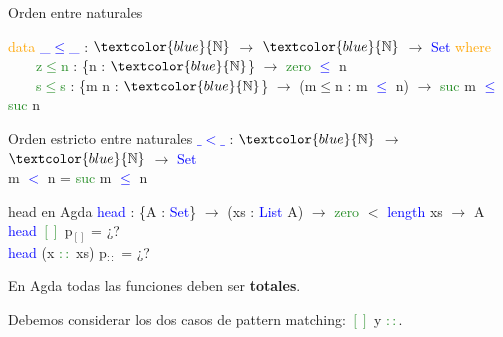 \documentclass[xcolor=dvipsnames]{beamer} %
\newcommand{\cf}[1]{\textcolor{blue}{#1}}
\newcommand{\ct}[1]{\textcolor{blue}{#1}}
\newcommand{\cc}[1]{\textcolor{ForestGreen}{#1}}
\newcommand{\ck}[1]{\textcolor{orange}{#1}}
\newcommand{\N}{\ct{\mathbb{N}}}
\newcommand{\ra}{\rightarrow}
\begin{document}
\begin{frame}[shrink=5]

\begin{block}{Orden entre naturales}

\ck{data} \ct{\_$\leq$\_} : $\N$ $\ra$ $\N$ $\ra$ \ct{Set} \ck{where}\\
\ \ \ \ \cc{z$\leq$n} : \{n : $\N$\}                 $\ra$ \cc{zero}  \ct{$\leq$} n\\
\ \ \ \ \cc{s$\leq$s} : \{m n : $\N$\} $\ra$ (m$\leq$n : m \ct{$\leq$} n) $\ra$ \cc{suc} m \ct{$\leq$} \cc{suc} n

\end{block}

\begin{block}{Orden estricto entre naturales}
\cf{$\_<\_$} : $\N$ $\ra$ $\N$ $\ra$ \ct{Set}\\
m \cf{$<$} n = \cc{suc} m \cf{$\leq$} n
\end{block}

\begin{block}{head en Agda}
    \cf{head} : \{A : \ct{Set}\}  $\ra$ (xs : \ct{List} A) $\ra$ 
    \cc{zero} $<$ \ct{length} xs $\rightarrow$ A \\
    \pause
    \cf{head} \cc{$[]$} p$_{[]}$ = ¿?\\
    \cf{head} (x \cc{$::$} xs) p$_{::}$ = ¿?
\end{block}  

\begin{block}{}
En Agda todas las funciones deben
ser \textbf{totales}. 

Debemos considerar los dos casos de pattern matching: \cc{$[]$} y \cc{$::$}.
\end{block}

\end{frame}
\end{document}
